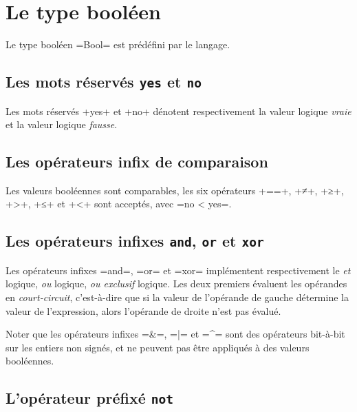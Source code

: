 




\chapter{Le type booléen}


Le type booléen \omnibus=Bool= est prédéfini par le langage.



\section{Les mots réservés \texttt{yes} et \texttt{no}}

Les mots réservés \omnibus+yes+ et \omnibus+no+ dénotent respectivement la valeur logique \emph{vraie} et la valeur logique \emph{fausse}.

\section{Les opérateurs infix de comparaison}

Les valeurs booléennes sont comparables, les six opérateurs \omnibus+==+, \omnibus+≠+, \omnibus+≥+, \omnibus+>+, \omnibus+≤+ et \omnibus+<+ sont acceptés, avec \omnibus=no < yes=.

\section{Les opérateurs infixes \texttt{and}, \texttt{or} et \texttt{xor}}

Les opérateurs infixes \omnibus=and=, \omnibus=or= et \omnibus=xor= implémentent respectivement le \emph{et} logique, \emph{ou} logique, \emph{ou exclusif} logique. Les deux premiers évaluent les opérandes en \emph{court-circuit}, c'est-à-dire que si la valeur de l'opérande de gauche détermine la valeur de l'expression, alors l'opérande de droite n'est pas évalué.

Noter que les opérateurs infixes \omnibus=&=, \omnibus=|= et \omnibus=^= sont des opérateurs bit-à-bit sur les entiers non signés, et ne peuvent pas être appliqués à des valeurs booléennes.


\section{L'opérateur préfixé \texttt{not}}

